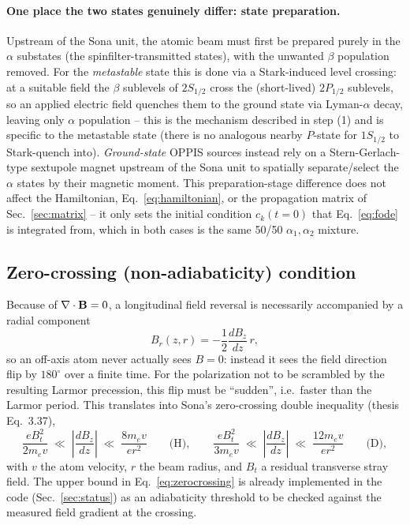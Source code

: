 \documentclass[11pt,a4paper]{article}
\begin{document}
\paragraph{One place the two states genuinely differ: state preparation.}
Upstream of the Sona unit, the atomic beam must first be prepared purely in
the $\alpha$ substates (the spinfilter-transmitted states), with the
unwanted $\beta$ population removed. For the \emph{metastable} state this is
done via a Stark-induced level crossing: at a suitable field the $\beta$
sublevels of $2S_{1/2}$ cross the (short-lived) $2P_{1/2}$ sublevels, so an
applied electric field quenches them to the ground state via Lyman-$\alpha$
decay, leaving only $\alpha$ population -- this is the mechanism described
in \cite{kannis2022spin} step (1) and is specific to the metastable state
(there is no analogous nearby $P$-state for $1S_{1/2}$ to Stark-quench
into). \emph{Ground-state} OPPIS sources instead rely on a Stern-Gerlach-type
sextupole magnet upstream of the Sona unit to spatially separate/select the
$\alpha$ states by their magnetic moment. This preparation-stage difference
does not affect the Hamiltonian, Eq.~\eqref{eq:hamiltonian}, or the
propagation matrix of Sec.~\ref{sec:matrix} -- it only sets the initial
condition $c_k(t{=}0)$ that Eq.~\eqref{eq:fode} is integrated from, which in
both cases is the same 50/50 $\alpha_1,\alpha_2$ mixture.

\subsection{Zero-crossing (non-adiabaticity) condition}

Because of $\nabla\cdot\vb{B}=0$, a longitudinal field reversal is
necessarily accompanied by a radial component
\begin{equation}
    B_r(z,r) = -\frac{1}{2}\frac{dB_z}{dz}\, r ,
    \label{eq:br}
\end{equation}
so an off-axis atom never actually sees $B=0$: instead it sees the field
direction flip by $180^\circ$ over a finite time. For the polarization not to
be scrambled by the resulting Larmor precession, this flip must be
``sudden'', i.e.\ faster than the Larmor period. This translates into
Sona's zero-crossing double inequality (thesis Eq.~3.37),
\begin{equation}
    \frac{e B_t^2}{2 m_e v} \;\ll\; \left|\frac{dB_z}{dz}\right| \;\ll\;
    \frac{8 m_e v}{e r^2} \qquad \text{(H)}, \qquad
    \frac{e B_t^2}{3 m_e v} \;\ll\; \left|\frac{dB_z}{dz}\right| \;\ll\;
    \frac{12 m_e v}{e r^2} \qquad \text{(D)},
    \label{eq:zerocrossing}
\end{equation}
with $v$ the atom velocity, $r$ the beam radius, and $B_t$ a residual
transverse stray field. The upper bound in Eq.~\eqref{eq:zerocrossing} is
already implemented in the code (Sec.~\ref{sec:status}) as an adiabaticity
threshold to be checked against the measured field gradient at the
crossing.
\end{document}
